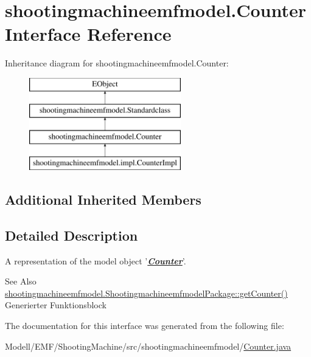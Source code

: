 \hypertarget{interfaceshootingmachineemfmodel_1_1_counter}{\section{shootingmachineemfmodel.\-Counter Interface Reference}
\label{interfaceshootingmachineemfmodel_1_1_counter}
}
Inheritance diagram for shootingmachineemfmodel.\-Counter\-:\begin{figure}[H]
\begin{center}
\leavevmode
\includegraphics[height=4.000000cm]{interfaceshootingmachineemfmodel_1_1_counter}
\end{center}
\end{figure}
\subsection*{Additional Inherited Members}


\subsection{Detailed Description}
A representation of the model object '{\itshape {\bfseries \hyperlink{interfaceshootingmachineemfmodel_1_1_counter}{Counter}}}'.

\begin{DoxySeeAlso}{See Also}
\hyperlink{interfaceshootingmachineemfmodel_1_1_shootingmachineemfmodel_package_adb1821e14aa48a86a4e0a95703544230}{shootingmachineemfmodel.\-Shootingmachineemfmodel\-Package\-::get\-Counter()}  Generierter Funktionsblock 
\end{DoxySeeAlso}


The documentation for this interface was generated from the following file\-:\begin{DoxyCompactItemize}
\item 
Modell/\-E\-M\-F/\-Shooting\-Machine/src/shootingmachineemfmodel/\hyperlink{_counter_8java}{Counter.\-java}\end{DoxyCompactItemize}
